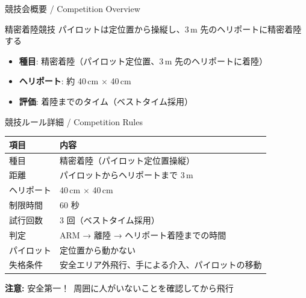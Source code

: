 \begin{frame}{競技会概要 / Competition Overview}
  \begin{block}{精密着陸競技}
    パイロットは定位置から操縦し、3\,m 先のヘリポートに精密着陸する
  \end{block}

  \vspace{1em}

  \begin{itemize}
    \item \textbf{種目}: 精密着陸（パイロット定位置、3\,m 先のヘリポートに着陸）
    \item \textbf{ヘリポート}: 約 40\,cm $\times$ 40\,cm
    \item \textbf{評価}: 着陸までのタイム（ベストタイム採用）
  \end{itemize}
\end{frame}

\begin{frame}{競技ルール詳細 / Competition Rules}
  \centering
  \begin{tabular}{ll}
    \hline
    \textbf{項目} & \textbf{内容} \\
    \hline
    種目      & 精密着陸（パイロット定位置操縦） \\
    距離      & パイロットからヘリポートまで 3\,m \\
    ヘリポート & 40\,cm $\times$ 40\,cm \\
    制限時間  & 60 秒 \\
    試行回数  & 3 回（ベストタイム採用） \\
    判定      & ARM → 離陸 → ヘリポート着陸までの時間 \\
    パイロット & 定位置から動かない \\
    失格条件  & 安全エリア外飛行、手による介入、パイロットの移動 \\
    \hline
  \end{tabular}

  \vspace{0.3em}
  {\small \textbf{注意:} 安全第一！\ 周囲に人がいないことを確認してから飛行}
\end{frame}

